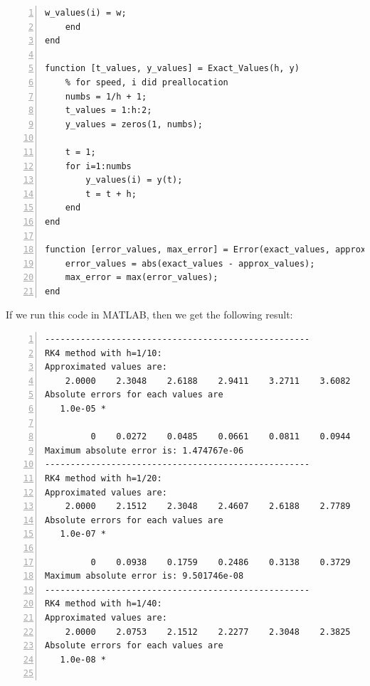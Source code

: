 \documentclass{article}
\begin{document}
\begin{enumerate}
\begin{enumerate}[wide=10pt]
\begin{lstlisting}[frame=single, numbers=left, style=Matlab-editor]
        w_values(i) = w;
    end
end

function [t_values, y_values] = Exact_Values(h, y)
    % for speed, i did preallocation
    numbs = 1/h + 1;
    t_values = 1:h:2;
    y_values = zeros(1, numbs);

    t = 1;
    for i=1:numbs
        y_values(i) = y(t);
        t = t + h;
    end
end

function [error_values, max_error] = Error(exact_values, approx_values)
    error_values = abs(exact_values - approx_values);
    max_error = max(error_values);
end
        \end{lstlisting} If we run this code in MATLAB, then we get the following result: \begin{lstlisting}[frame=single, numbers=left, style=Matlab-editor]
----------------------------------------------------
RK4 method with h=1/10:
Approximated values are:
    2.0000    2.3048    2.6188    2.9411    3.2711    3.6082    3.9520    4.3021    4.6580    5.0195    5.3863
Absolute errors for each values are
   1.0e-05 *

         0    0.0272    0.0485    0.0661    0.0811    0.0944    0.1064    0.1175    0.1280    0.1379    0.1475
Maximum absolute error is: 1.474767e-06
----------------------------------------------------
RK4 method with h=1/20:
Approximated values are:
    2.0000    2.1512    2.3048    2.4607    2.6188    2.7789    2.9411    3.1051    3.2711    3.4388    3.6082    3.7793    3.9520    4.1263    4.3021    4.4793    4.6580    4.8381    5.0195    5.2023    5.3863
Absolute errors for each values are
   1.0e-07 *

         0    0.0938    0.1759    0.2486    0.3138    0.3729    0.4270    0.4771    0.5238    0.5677    0.6092    0.6487    0.6864    0.7228    0.7579    0.7919    0.8250    0.8572    0.8888    0.9198    0.9502
Maximum absolute error is: 9.501746e-08
----------------------------------------------------
RK4 method with h=1/40:
Approximated values are:
    2.0000    2.0753    2.1512    2.2277    2.3048    2.3825    2.4607    2.5395    2.6188    2.6986    2.7789    2.8598    2.9411    3.0229    3.1051    3.1879    3.2711    3.3547    3.4388    3.5233    3.6082    3.6935    3.7793    3.8655    3.9520    4.0390    4.1263    4.2140    4.3021    4.3905    4.4793    4.5685    4.6580    4.7479    4.8381    4.9286    5.0195    5.1107    5.2023    5.2941    5.3863
Absolute errors for each values are
   1.0e-08 *


\end{lstlisting}
\end{enumerate}
\end{enumerate}
\end{document}
